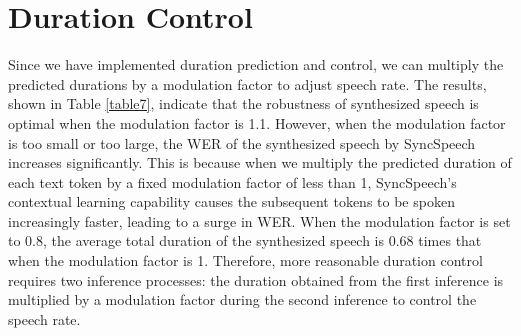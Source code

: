 \section{Duration Control}
\label{Duration Control}
Since we have implemented duration prediction and control, we can multiply the predicted durations by a modulation factor to adjust speech rate. The results, shown in Table \ref{table7}, indicate that the robustness of synthesized speech is optimal when the modulation factor is 1.1.  However, when the modulation factor is too small or too large, the WER of the synthesized speech by SyncSpeech increases significantly. This is because when we multiply the predicted duration of each text token by a fixed modulation factor of less than 1, SyncSpeech's contextual learning capability causes the subsequent tokens to be spoken increasingly faster, leading to a surge in WER. When the modulation factor is set to 0.8, the average total duration of the synthesized speech is 0.68 times that when the modulation factor is 1. Therefore, more reasonable duration control requires two inference processes: the duration obtained from the first inference is multiplied by a modulation factor during the second inference to control the speech rate.



\begin{table}[]
\centering
{}
\caption{Performance comparison with different modulation factors for duration control in terms of WER.}

\label{table7}
\end{table}



